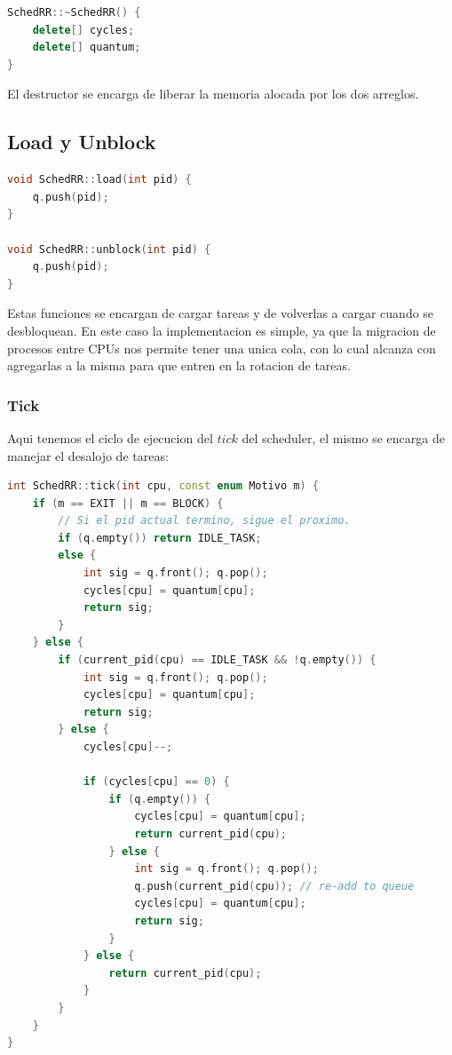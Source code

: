 \begin{lstlisting}[language=C++, breaklines=true]
SchedRR::~SchedRR() {
	delete[] cycles;
	delete[] quantum;
}
\end{lstlisting}

El destructor se encarga de liberar la memoria alocada por los dos arreglos.

\subsection{Load y Unblock}

\begin{lstlisting}[language=C++, breaklines=true]
void SchedRR::load(int pid) {
	q.push(pid);
}

void SchedRR::unblock(int pid) {
	q.push(pid);
}
\end{lstlisting}

Estas funciones se encargan de cargar tareas y de volverlas a cargar cuando se desbloquean. En este caso la implementacion es simple, ya que la migracion de procesos entre CPUs nos permite tener una unica cola, con lo cual alcanza con agregarlas a la misma para que entren en la rotacion de tareas.

\subsubsection{Tick}

Aqui tenemos el ciclo de ejecucion del $tick$ del scheduler, el mismo se encarga de manejar el desalojo de tareas:

\begin{lstlisting}[language=C++, breaklines=true]
int SchedRR::tick(int cpu, const enum Motivo m) {
	if (m == EXIT || m == BLOCK) {
		// Si el pid actual termino, sigue el proximo.
		if (q.empty()) return IDLE_TASK;
		else {
			int sig = q.front(); q.pop();
			cycles[cpu] = quantum[cpu];
			return sig;
		}
	} else {
		if (current_pid(cpu) == IDLE_TASK && !q.empty()) {
			int sig = q.front(); q.pop();
			cycles[cpu] = quantum[cpu];
			return sig;
		} else {
			cycles[cpu]--;

			if (cycles[cpu] == 0) {
				if (q.empty()) {
					cycles[cpu] = quantum[cpu];
					return current_pid(cpu);
				} else {
					int sig = q.front(); q.pop();
					q.push(current_pid(cpu)); // re-add to queue
					cycles[cpu] = quantum[cpu];
					return sig;
				}
			} else {
				return current_pid(cpu);
			}
		}
	}
}
\end{lstlisting}

